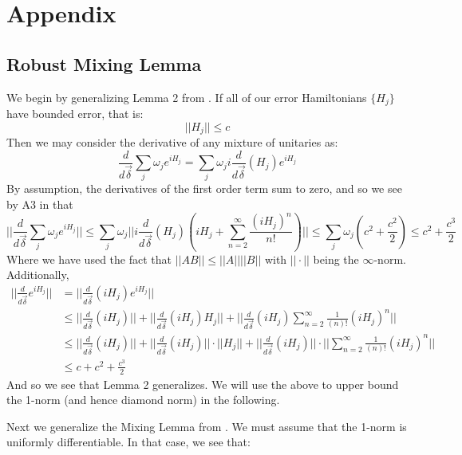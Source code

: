 \documentclass[aps,nofootinbib,pra,notitlepage,twocolumn]{revtex4-1}
\newcommand{\deriv}[0]{{\frac{d}{d\vec{\delta}}}}
\def\id{\mbox{\small 1} \!\! \mbox{1}}
\begin{document}
\section{Appendix}
\label{sec:appendix}
\subsection{Robust Mixing Lemma}
We begin by generalizing Lemma 2 from \cite{Campbell2017}. If all of our error Hamiltonians $\{H_j\}$ have bounded error, that is:
\begin{equation}
||H_j||\leq c
\end{equation}
Then we may consider the derivative of any mixture of unitaries as:
\begin{equation}
\deriv\sum_j \omega_je^{iH_j} = \sum_j\omega_ji\deriv (H_j)e^{iH_j}
\end{equation}
By assumption, the derivatives of the first order term sum to zero, and so we see by A3 in \cite{Campbell2017} that
\begin{equation}
||\deriv\sum_j\omega_je^{iH_j}|| \leq \sum_j\omega_j||i\deriv (H_j)(iH_j + \sum_{n=2}^{\infty}\frac{(iH_j)^n}{n!})|| \leq \sum_j\omega_j(c^2 + \frac{c^2}{2}) \leq c^2 + \frac{c^3}{2}
\end{equation}
Where we have used the fact that $||AB|| \leq ||A||||B||$ with $||\cdot||$ being the $\infty$-norm.
Additionally, 
\begin{align}
||\deriv e^{iH_j}|| &= ||\deriv(iH_j)e^{iH_j}|| \\
&\leq ||\deriv(iH_j)|| + ||\deriv(iH_j)H_j|| +  ||\deriv(iH_j)\sum^{\infty}_{n=2}\frac{1}{(n)!}(iH_j)^n|| \\
&\leq ||\deriv(iH_j)|| + ||\deriv(iH_j)||\cdot||H_j|| +  ||\deriv(iH_j)||\cdot||\sum^{\infty}_{n=2}\frac{1}{(n)!}(iH_j)^n||\\
&\leq c + c^2 + \frac{c^3}{2}
\end{align}
And so we see that Lemma 2 generalizes. We will use the above to upper bound the 1-norm (and hence diamond norm) in the following.

Next we generalize the Mixing Lemma from \cite{Campbell2017}. We must assume that the 1-norm is uniformly differentiable. In that case, we see that:
\end{document}
